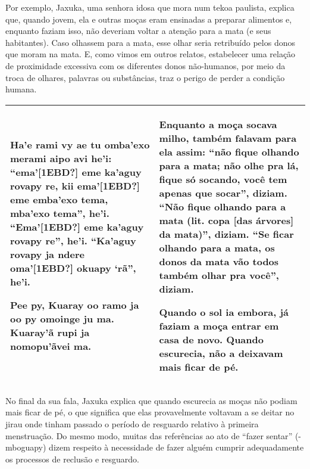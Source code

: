 \documentclass{article}
\begin{document}
Por exemplo, Jaxuka, uma senhora idosa que mora num tekoa paulista,
explica que, quando jovem, ela e outras mo\c{c}as eram ensinadas a
preparar alimentos e, enquanto faziam isso, n\~ao deveriam voltar a
aten\c{c}\~ao para a mata (e seus habitantes). Caso olhassem para a
mata, esse olhar seria retribu\'ido pelos donos que moram na mata. E,
como vimos em outros relatos, estabelecer uma rela\c{c}\~ao de
proximidade excessiva com os diferentes donos n\~ao-humanos, por meio
da troca de olhares, palavras ou subst\^ancias, traz o perigo de perder
a condi\c{c}\~ao humana.  

\begin{flushleft}
\tablehead{}
\begin{supertabular}{m{2.88166in}|m{2.87406in}}
Ha{\textquoteright}e rami vy ae tu omba{\textquoteright}exo merami aipo
avi he{\textquoteright}i:
{\textquotedblleft}ema{\textquoteright}[1EBD?] eme
ka{\textquoteright}aguy rovapy re, kii ema{\textquoteright}[1EBD?] eme
emba{\textquoteright}exo tema, mba{\textquoteright}exo
tema{\textquotedblright}, he{\textquoteright}i.
{\textquotedblleft}Ema{\textquoteright}[1EBD?] eme
ka{\textquoteright}aguy rovapy re{\textquotedblright},
he{\textquoteright}i. {\textquotedblleft}Ka{\textquoteright}aguy rovapy
ja ndere oma{\textquoteright}[1EBD?] okuapy
{\textquoteleft}r\~a{\textquotedblright}, he{\textquoteright}i. 

Pee py, Kuaray oo ramo ja oo py omoinge ju ma.
Kuaray{\textquoteright}\~a rupi ja nomopu{\textquoteright}\~avei ma. 

 &
Enquanto a mo\c{c}a socava milho, tamb\'em falavam para ela assim:
{\textquotedblleft}n\~ao fique olhando para a mata; n\~ao olhe pra
l\'a, fique s\'o socando, voc\^e tem apenas que
socar{\textquotedblright}, diziam. {\textquotedblleft}N\~ao fique
olhando para a mata (lit. copa [das \'arvores] da
mata){\textquotedblright}, diziam. {\textquotedblleft}Se ficar olhando
para a mata, os donos da mata v\~ao todos tamb\'em olhar pra
voc\^e{\textquotedblright}, diziam. 

Quando o sol ia embora, j\'a faziam a mo\c{c}a entrar em casa de novo.
Quando escurecia, n\~ao a deixavam mais ficar de p\'e.\\\hline
\end{supertabular}
\end{flushleft}
No final da sua fala, Jaxuka explica que quando escurecia as mo\c{c}as
n\~ao podiam mais ficar de p\'e, o que significa que elas provavelmente
voltavam a se deitar no jirau onde tinham passado o per\'iodo de
resguardo relativo \`a primeira menstrua\c{c}\~ao. Do mesmo modo,
muitas das refer\^encias ao ato de {\textquotedblleft}fazer
sentar{\textquotedblright} (-mboguapy) dizem respeito \`a necessidade
de fazer algu\'em cumprir adequadamente os processos de reclus\~ao e
resguardo. 
\end{document}
